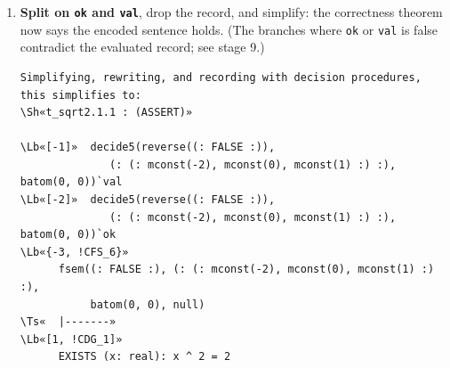 \documentclass[11pt]{article}
\newcommand\Lb[1]{\textcolor{muted}{#1}}
\newcommand\Ts[1]{\textcolor{muted}{#1}}
\newcommand\Sh[1]{\textcolor{accent}{#1}}
\begin{document}
\begin{enumerate}[leftmargin=1.4em, itemsep=10pt, label=\textbf{\textcolor{accent}{\arabic*}}]
\begin{termbox}
\begin{Verbatim}[commandchars=\\«»]
\Lb«{-1, !CFS_6}»
      FORALL (F: list[list[mpoly]], os: list[bool], phi: BF):
        decide5(reverse(os), F, phi)`ok IMPLIES
         (decide5(reverse(os), F, phi)`val IFF fsem(os, F, phi, null))
\Lb«{-2, !CDE_2}»
      (decide5(reverse((: FALSE :)),
               (: (: mconst(-2), mconst(0), mconst(1) :) :), batom(0, 0)))
       = (# ok := TRUE, val := TRUE #)
\Ts«  |-------»
\Lb«{1, !CDG_1}»
      EXISTS (x: real): x ^ 2 = 2

Instantiating the top quantifier in !CFS_6 with the terms:
 (: (: mconst(-2), mconst(0), mconst(1) :) :), (: FALSE :), batom(0, 0),
this simplifies to:
\Sh«t_sqrt2 : (INST !CFS_6 "(: (: mconst(-2), mconst(0), mconst(1) :) :)"»
           "(: FALSE :)" "batom(0, 0)")

\Lb«{-1, !CFS_6}»
      decide5(reverse((: FALSE :)),
              (: (: mconst(-2), mconst(0), mconst(1) :) :), batom(0, 0))`ok
       IMPLIES
       (decide5(reverse((: FALSE :)),
                (: (: mconst(-2), mconst(0), mconst(1) :) :),
                batom(0, 0))`val
         IFF
         fsem((: FALSE :), (: (: mconst(-2), mconst(0), mconst(1) :) :),
              batom(0, 0), null))
\Lb«[-2, !CDE_2]»
      (decide5(reverse((: FALSE :)),
               (: (: mconst(-2), mconst(0), mconst(1) :) :), batom(0, 0)))
       = (# ok := TRUE, val := TRUE #)
\Ts«  |-------»
\Lb«[1, !CDG_1]»
      EXISTS (x: real): x ^ 2 = 2

Case splitting on
   decide5(reverse((: FALSE :)), (: (: mconst(-2), mconst(0), mconst(1) :) :),
\end{Verbatim}
\end{termbox}

\item \textbf{Split on \texttt{ok} and \texttt{val}}, drop the record, and simplify: the correctness theorem now says the
encoded sentence holds. (The branches where \texttt{ok} or \texttt{val} is false contradict the evaluated record; see stage 9.)
\begin{termbox}
\begin{Verbatim}[commandchars=\\«»]
Simplifying, rewriting, and recording with decision procedures,
this simplifies to:
\Sh«t_sqrt2.1.1 : (ASSERT)»

\Lb«[-1]»  decide5(reverse((: FALSE :)),
              (: (: mconst(-2), mconst(0), mconst(1) :) :), batom(0, 0))`val
\Lb«[-2]»  decide5(reverse((: FALSE :)),
              (: (: mconst(-2), mconst(0), mconst(1) :) :), batom(0, 0))`ok
\Lb«{-3, !CFS_6}»
      fsem((: FALSE :), (: (: mconst(-2), mconst(0), mconst(1) :) :),
           batom(0, 0), null)
\Ts«  |-------»
\Lb«[1, !CDG_1]»
      EXISTS (x: real): x ^ 2 = 2
\end{Verbatim}
\end{termbox}


\end{enumerate}
\end{document}
